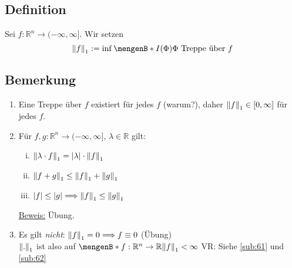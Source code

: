 \subsection[Definition: $L^1$-Halbnorm]{Definition} %
\label{sub:37}
Sei $f : \mathds{R}^n \to (-\infty, \infty]$. Wir setzen 
\[
	\norm[1]{f} :=  \inf \set[I(\Phi)]{\Phi \text{ Treppe über }f } 
\]

\subsection[Bemerkungen zur $L^1$-Halbnorm]{Bemerkung} %
\label{sub:38}
\begin{enumerate}[1.]
	\item Eine Treppe über $f$ existiert für jedes $f$ (warum?), daher $\norm[1]{f} \in [0, \infty] $ für jedes $f$.
	\item Für $f,g : \mathds{R}^n \to (- \infty, \infty]$, $\lambda  \in \mathds{R}$ gilt:
	\begin{enumerate}[(i)]
		\item $\norm[1]{\lambda  \cdot f}  = \abs{\lambda } \cdot  \norm[1]{f}  $
		\item $\norm[1]{f+g} \le \norm[1]{f} + \norm[1]{g}   $
		\item $\abs{f} \le \abs{g} \Longrightarrow \norm[1]{f} \le \norm[1]{g}   $
	\end{enumerate}
	\uline{Beweis:} Übung.
	\item Es gilt \emph{nicht}: $\norm[1]{f} = 0 \Longrightarrow f \equiv 0 $ (Übung)\\
	$\norm[1]{.} $ ist also  auf $\set[f : \mathds{R}^n \to \mathds{R}]{\norm[1]{f} < \infty } $ VR: Siehe \ref{sub:61} und \ref{sub:62}
\end{enumerate}

